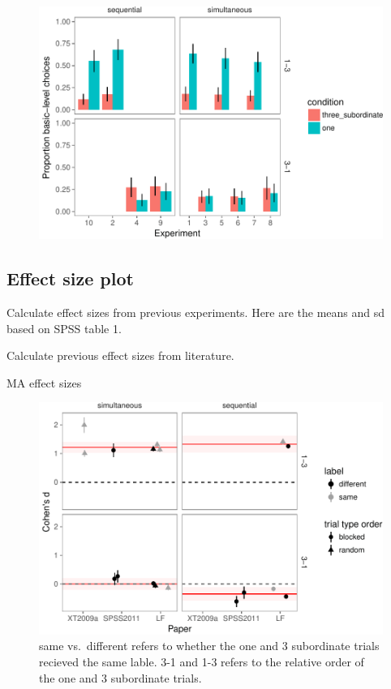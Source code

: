 \documentclass[english,floatsintext,man]{apa6}
\theoremstyle{definition}
\theoremstyle{definition}
\theoremstyle{remark}
\begin{document}
\begin{figure}
\centering
\includegraphics{xtmem_files/figure-latex/unnamed-chunk-3-1.pdf}
\caption{}
\end{figure}

\subsection{Effect size plot}\label{effect-size-plot}

Calculate effect sizes from previous experiments. Here are the means and
sd based on SPSS table 1.

Calculate previous effect sizes from literature.

MA effect sizes

\begin{figure}
\centering
\includegraphics{xtmem_files/figure-latex/unnamed-chunk-9-1.pdf}
\caption{\label{fig:unnamed-chunk-9}same vs.~different refers to whether the
one and 3 subordinate trials recieved the same lable. 3-1 and 1-3 refers
to the relative order of the one and 3 subordinate trials.}
\end{figure}
\end{document}
